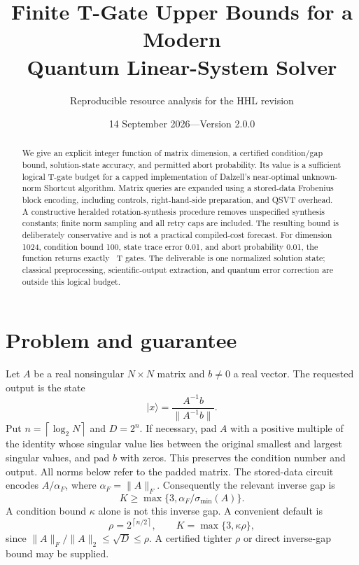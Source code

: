 \documentclass[11pt]{article}
\title{Finite T-Gate Upper Bounds for a Modern\\Quantum Linear-System Solver}
\author{Reproducible resource analysis for the HHL revision}
\date{14 September 2026\quad---\quad Version 2.0.0}
\newcommand{\ceil}[1]{\left\lceil #1\right\rceil}
\newcommand{\ket}[1]{\lvert #1\rangle}
\newcommand{\norm}[1]{\lVert #1\rVert}
\begin{document}
\maketitle
\begin{abstract}
We give an explicit integer function of matrix dimension, a certified condition/gap bound, solution-state accuracy, and permitted abort probability. Its value is a sufficient logical T-gate budget for a capped implementation of Dalzell's near-optimal unknown-norm Shortcut algorithm. Matrix queries are expanded using a stored-data Frobenius block encoding, including controls, right-hand-side preparation, and QSVT overhead. A constructive heralded rotation-synthesis procedure removes unspecified synthesis constants; finite norm sampling and all retry caps are included. The resulting bound is deliberately conservative and is not a practical compiled-cost forecast. For dimension 1024, condition bound 100, state trace error 0.01, and abort probability 0.01, the function returns exactly \GenericT\ T gates. The deliverable is one normalized solution state; classical preprocessing, scientific-output extraction, and quantum error correction are outside this logical budget.
\end{abstract}

\section{Problem and guarantee}
Let $A$ be a real nonsingular $N\times N$ matrix and $b\ne0$ a real vector. The requested output is the state
\begin{equation}
 \ket{x}=\frac{A^{-1}b}{\norm{A^{-1}b}}.
\end{equation}
Put $n=\ceil{\log_2N}$ and $D=2^n$. If necessary, pad $A$ with a positive multiple of the identity whose singular value lies between the original smallest and largest singular values, and pad $b$ with zeros. This preserves the condition number and output. All norms below refer to the padded matrix. The stored-data circuit encodes $A/\alpha_F$, where $\alpha_F=\norm{A}_F$. Consequently the relevant inverse gap is
\begin{equation}\label{eq:gap}
 K\ge \max\{3,\alpha_F/\sigma_{\min}(A)\}.
\end{equation}
A condition bound $\kappa$ alone is not this inverse gap. A convenient default is
\begin{equation}
 \rho=2^{\ceil{n/2}},\qquad K=\max\{3,\kappa\rho\},
\end{equation}
since $\norm{A}_F/\norm{A}_2\le\sqrt D\le\rho$. A certified tighter $\rho$ or direct inverse-gap bound may be supplied.
\end{document}
